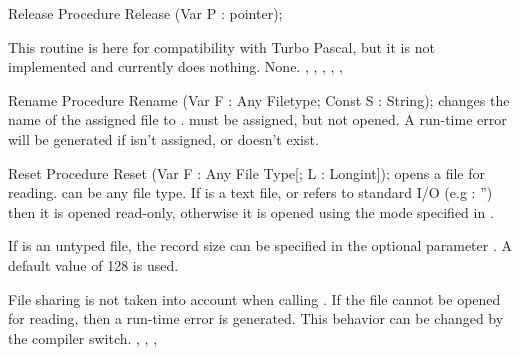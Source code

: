 
\begin{procedure}{Release}
\Declaration
Procedure Release (Var P : pointer);

\Description
This routine is here for compatibility with Turbo Pascal, but
it is not implemented and currently does nothing.
\Errors
None.
\SeeAlso
{}, , , , 
, 
\end{procedure}

\begin{procedure}{Rename}
\Declaration
Procedure Rename (Var F : Any Filetype; Const S : String);
\Description
{} changes the name of the assigned file  to .
must be assigned, but not opened.
\Errors
A run-time error will be generated if  isn't assigned,
or doesn't exist.
\SeeAlso
{}
\end{procedure}


\begin{procedure}{Reset}
\Declaration
Procedure Reset (Var F : Any File Type[; L : Longint]);
\Description
{} opens a file  for reading.  can be any file type.
If  is a text file, or refers to standard I/O (e.g : '') then it is 
opened read-only, otherwise it is opened using the mode specified in 
.

If  is an untyped file, the record size can be specified in
the optional parameter . A default value of 128 is used.

File sharing is not taken into account when calling .
\Errors
If the file cannot be opened for reading, then a run-time error is
generated. This behavior can be changed by the  compiler switch.
\SeeAlso
{}, , , 
\end{procedure}


